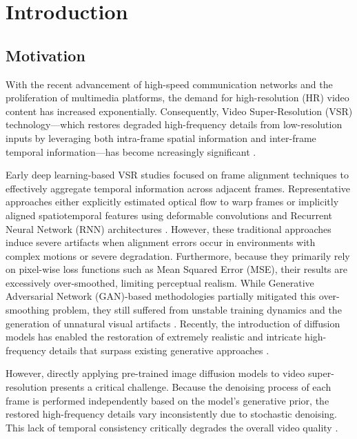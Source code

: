 \chapter{Introduction}{}{}
\label{CH:INTRO}%

\section{Motivation}

With the recent advancement of high-speed communication networks and the proliferation of multimedia platforms, the demand for high-resolution (HR) video content has increased exponentially. Consequently, Video Super-Resolution (VSR) technology---which restores degraded high-frequency details from low-resolution inputs by leveraging both intra-frame spatial information and inter-frame temporal information---has become ncreasingly significant \cite{wang2020survey, liu2022video}.


Early deep learning-based VSR studies focused on frame alignment techniques to effectively aggregate temporal information across adjacent frames. Representative approaches either explicitly estimated optical flow to warp frames \cite{xue2019toflow} or implicitly aligned spatiotemporal features using deformable convolutions and Recurrent Neural Network (RNN) architectures \cite{wang2019edvr, chan2021basicvsr}. However, these traditional 
approaches induce severe artifacts when alignment errors occur in environments with complex motions or severe degradation. Furthermore, because they primarily rely on pixel-wise loss functions such as Mean Squared Error (MSE), their results are excessively over-smoothed, limiting perceptual realism. While Generative Adversarial Network (GAN)-based methodologies partially mitigated this over-smoothing problem, they still suffered from 
unstable training dynamics and the generation of unnatural visual artifacts \cite{ledig2017srgan, wang2018esrgan}. Recently, the introduction of diffusion models has enabled the restoration of extremely realistic and intricate high-frequency details that surpass existing generative approaches \cite{ho2020ddpm, saharia2022sr3}.


However, directly applying pre-trained image diffusion models to video super-resolution presents a critical challenge. Because the denoising process of each frame is performed independently based on the model's generative prior, the restored high-frequency details vary inconsistently due to stochastic denoising. This 
lack of temporal consistency critically degrades the overall video quality \cite{chu2020temporal}.


